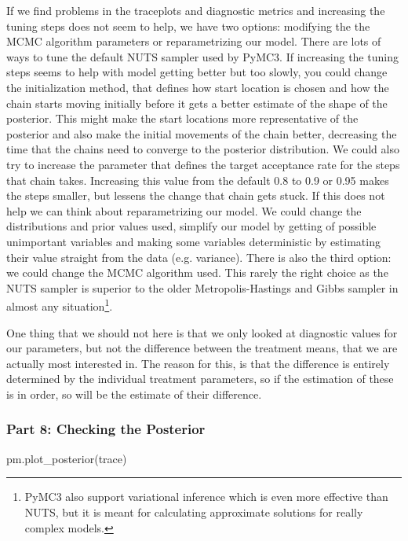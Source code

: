 \documentclass[12pt,a4paper,leqno]{report}
\theoremstyle{plain}
\theoremstyle{definition}
\theoremstyle{remark}
\begin{document}
If we find problems in the traceplots and diagnostic metrics and increasing the tuning
steps does not seem to help, we have two options: modifying the
the MCMC algorithm parameters or reparametrizing our
model. There are lots of ways to tune the default NUTS sampler used by PyMC3. If
increasing the tuning steps seems to help with model getting better but too slowly, you
could change the initialization method, that defines how start location is chosen and how
the chain starts moving initially before it gets a better estimate of the shape of the
posterior. This might make the start locations more representative of the posterior and
also make the initial movements of the chain better, decreasing the time that the chains
need to converge to the posterior distribution. We could also try to increase the
parameter  that defines the target acceptance rate for the steps
that chain takes. Increasing this value from the default 0.8 to 0.9 or 0.95 makes the
steps smaller, but lessens the change that chain gets stuck. If this does not help we
can think about reparametrizing our model. We could change the distributions and prior
values used, simplify our model by getting of possible unimportant variables and making
some variables deterministic by estimating their value straight from the data (e.g.
variance). There is also the third option: we could change the MCMC algorithm used. This
rarely the right choice as the NUTS sampler is superior to the older Metropolis-Hastings
and Gibbs sampler in almost any situation\footnote{PyMC3 also support variational
inference which is even more effective than NUTS, but it is meant for calculating approximate
solutions for really complex models.}.


One thing that we should not here is that we only looked at diagnostic values for our
parameters, but not the difference between the treatment means, that we are actually
most interested in. The reason for this, is that the difference is entirely determined
by the individual treatment parameters, so if the estimation of these is in order, so
will be the estimate of their difference.

\subsubsection*{Part 8: Checking the Posterior}

\bigskip
\begin{pyverbatim}[][fontsize=\footnotesize]
    pm.plot_posterior(trace)
\end{pyverbatim}
\smallskip
\end{document}
